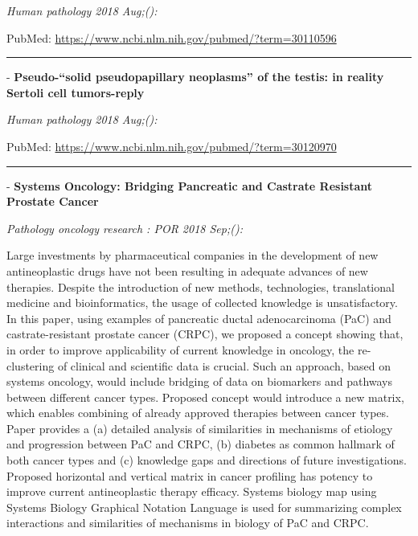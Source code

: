 \documentclass[]{article}
\begin{document}
\emph{Human pathology 2018 Aug;():}

PubMed: \url{https://www.ncbi.nlm.nih.gov/pubmed/?term=30110596}

{}

{}

\begin{center}\rule{0.5\linewidth}{\linethickness}\end{center}

 - \textbf{Pseudo-``solid pseudopapillary neoplasms'' of the testis: in
reality Sertoli cell tumors-reply}

\emph{Human pathology 2018 Aug;():}

PubMed: \url{https://www.ncbi.nlm.nih.gov/pubmed/?term=30120970}

{}

{}

\begin{center}\rule{0.5\linewidth}{\linethickness}\end{center}

 - \textbf{Systems Oncology: Bridging Pancreatic and Castrate Resistant
Prostate Cancer}

\emph{Pathology oncology research : POR 2018 Sep;():}

Large investments by pharmaceutical companies in the development of new
antineoplastic drugs have not been resulting in adequate advances of new
therapies. Despite the introduction of new methods, technologies,
translational medicine and bioinformatics, the usage of collected
knowledge is unsatisfactory. In this paper, using examples of pancreatic
ductal adenocarcinoma (PaC) and castrate-resistant prostate cancer
(CRPC), we proposed a concept showing that, in order to improve
applicability of current knowledge in oncology, the re-clustering of
clinical and scientific data is crucial. Such an approach, based on
systems oncology, would include bridging of data on biomarkers and
pathways between different cancer types. Proposed concept would
introduce a new matrix, which enables combining of already approved
therapies between cancer types. Paper provides a (a) detailed analysis
of similarities in mechanisms of etiology and progression between PaC
and CRPC, (b) diabetes as common hallmark of both cancer types and (c)
knowledge gaps and directions of future investigations. Proposed
horizontal and vertical matrix in cancer profiling has potency to
improve current antineoplastic therapy efficacy. Systems biology map
using Systems Biology Graphical Notation Language is used for
summarizing complex interactions and similarities of mechanisms in
biology of PaC and CRPC.
\end{document}
